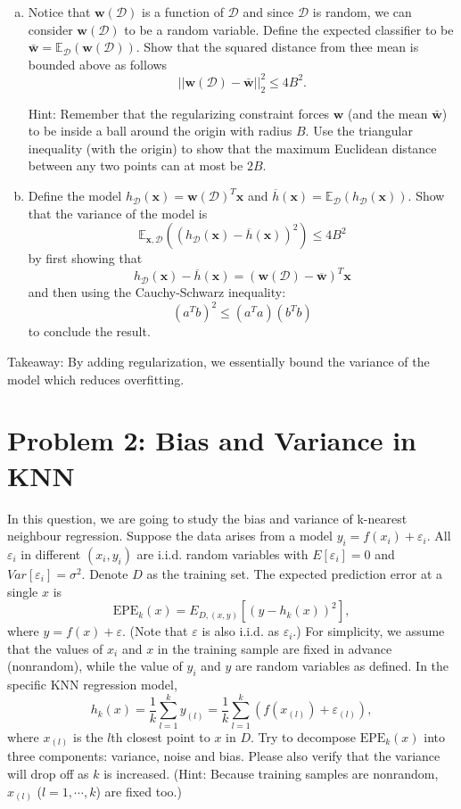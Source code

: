 \documentclass{article}
\begin{document}
    \begin{enumerate}[(a)]
        \item Notice that $\mathbf{w}(\mathcal{D})$ is a function of $\mathcal{D}$ and since $\mathcal{D}$ is random, we can consider $\mathbf{w}(\mathcal{D})$ to be a random variable. Define the expected classifier to be $\bar{\mathbf{w}} = \mathbb{E}_{\mathcal{D}}(\mathbf{w}(\mathcal{D}))$. Show that the squared distance from thee mean is bounded above as follows   
        $$||\mathbf{w}(\mathcal{D}) - \bar{\mathbf{w}} ||_2^2 \leq 4B^2.$$


        Hint: Remember that the regularizing constraint forces $\mathbf{w}$ (and the mean $\bar{\mathbf{w}}$) to be inside a ball around the origin with radius $B$. Use the triangular inequality (with the origin) to show that the maximum Euclidean distance between any two points can at most be $2B$. 

        \item Define the model $h_\mathcal{D}(\mathbf{x}) = \mathbf{w}(\mathcal{D}) ^T \mathbf{x}$ and $\overline{h}(\mathbf{x}) = \mathbb{E}_{\mathcal{D}} (h_\mathcal{D}(\mathbf{x}))$. Show that the variance of the model is
        $$\mathbb{E}_{\mathbf{x}, \mathcal{D}}((h_\mathcal{D}(\mathbf{x}) - \overline{h}(\mathbf{x})) ^ 2) \leq 4B^2$$ by first showing that $$h_\mathcal{D}(\mathbf{x}) - \overline{h}(\mathbf{x}) = (\mathbf{w}(\mathcal{D}) - \overline{\mathbf{w}}) ^T \mathbf{x}$$ and then using the Cauchy-Schwarz inequality: $$(a^Tb)^2 \leq (a^Ta )(b^Tb)$$ to conclude the result. 
    \end{enumerate} 
    Takeaway: By adding regularization, we essentially bound the variance of the model which reduces overfitting. 
    
    \section*{Problem 2: Bias and Variance in KNN}
    In this question, we are going to study the bias and variance of k-nearest neighbour regression. Suppose the data arises from a model $y_i = f(x_i) + \varepsilon_i$. All $\varepsilon_i$ in different $(x_i, y_i)$ are i.i.d. random variables with $E[\varepsilon_i] = 0$ and $Var[\varepsilon_i] = \sigma^2$. Denote $D$ as the training set. The expected prediction error at a single $x$ is 
    $$\text{EPE}_k(x) = E_{D, (x, y)}[(y - h_k(x))^2],$$
    where $y = f(x) + \varepsilon$. (Note that $\varepsilon$ is also i.i.d. as $\varepsilon_i$.) For simplicity, we assume that the values of $x_i$ and $x$ in the training sample are fixed in advance (nonrandom), while the value of $y_i$ and $y$ are random variables as defined. In the specific KNN regression model,
    $$h_k(x) =\frac{1}{k}\sum_{l=1}^{k}y_{(l)} =  \frac{1}{k}\sum_{l=1}^{k}(f(x_{(l)}) + \varepsilon_{(l)}),$$
    where $x_{(l)}$ is the $l$th closest point to $x$ in $D$. Try to decompose $\text{EPE}_k(x)$ into three components: variance, noise and bias. Please also verify that the variance will drop off as $k$ is increased.
 (Hint: Because training samples are nonrandom, $x_{(l)}$ ($l=1, \cdots, k$) are fixed too.)
\end{document}
